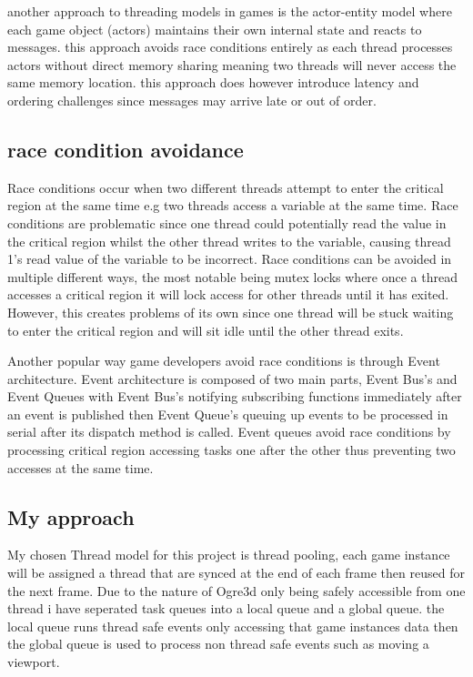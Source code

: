 \documentclass[]{final_report}
\begin{document}
another approach to threading models in games is the actor-entity model where each game object (actors) maintains their own internal state and reacts to messages. this approach avoids race conditions entirely as each thread processes actors without direct memory sharing meaning two threads will never access the same memory location. this approach does however introduce latency and ordering challenges since messages may arrive late or out of order.

\subsection{race condition avoidance}
Race conditions occur when two different threads attempt to enter the critical region at the same time e.g two threads access a variable at the same time. Race conditions are problematic since one thread could potentially read the value in the critical region whilst the other thread writes to the variable, causing thread 1’s read value of the variable to be incorrect.
Race conditions can be avoided in multiple different ways, the most notable being mutex locks where once a thread accesses a critical region it will lock access for other threads until it has exited. However, this creates problems of its own since one thread will be stuck waiting to enter the critical region and will sit idle until the other thread exits.

Another popular way game developers avoid race conditions is through Event architecture. Event architecture is composed of two main parts, Event Bus's and Event Queues with Event Bus's notifying subscribing functions immediately after an event is published then Event Queue's queuing up events to be processed in serial after its dispatch method is called. Event queues avoid race conditions by processing critical region accessing tasks one after the other thus preventing two accesses at the same time. 

\subsection{My approach}
My chosen Thread model for this project is thread pooling, each game instance will be assigned a thread that are synced at the end of each frame then reused for the next frame. Due to the nature of Ogre3d only being safely accessible from one thread i have seperated task queues into a local queue and a global queue. the local queue runs thread safe events only accessing that game instances data then the global queue is used to process non thread safe events such as moving a viewport.
\end{document}
